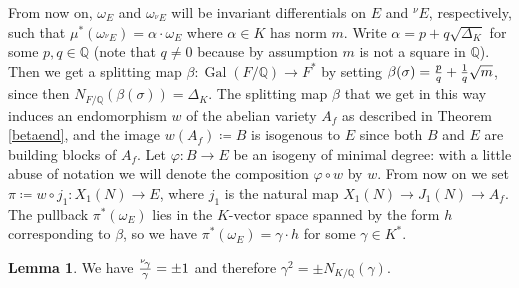 \documentclass[11pt]{amsart}
\theoremstyle{definition}
\newtheorem{lem}[definizione]{Lemma}
\begin{document}
		From now on, $\omega_E$ and $\omega_{{{}^\nu\!} E}$ will be invariant differentials on $E$ and ${{}^\nu\!} E$, respectively, such that $\mu^*(\omega_{{{}^\nu\!} E})=\alpha\cdot\omega_E$ where $\alpha\in K$ has norm $m$. Write $\alpha=p+q\sqrt{\Delta_K}$ for some $p,q\in {\mathbb{Q}}$ (note that $q\neq 0$ because by assumption $m$ is not a square in ${\mathbb{Q}}$). Then we get a splitting map $\beta\colon \operatorname{Gal}(F/{\mathbb{Q}})\to F^*$ by setting ${\displaystyle} \beta(\sigma)=\frac{p}{q}+\frac{1}{q}\sqrt{m}$, since then $N_{F/{\mathbb{Q}}}(\beta(\sigma))=\Delta_K$. The splitting map $\beta$ that we get in this way induces an endomorphism $w$ of the abelian variety $A_f$ as described in Theorem \ref{betaend}, and the image $w(A_f)\coloneqq B$ is isogenous to $E$ since both $B$ and $E$ are building blocks of $A_f$. Let $\varphi\colon B\to E$ be an isogeny of minimal degree: with a little abuse of notation we will denote the composition $\varphi\circ w$ by $w$. From now on we set $\pi\coloneqq w\circ j_1 \colon X_1(N)\to E$, where $j_1$ is the natural map $X_1(N)\to J_1(N)\to A_f$. The pullback $\pi^*(\omega_E)$ lies in the $K$-vector space spanned by the form $h$ corresponding to $\beta$, so we have $\pi^*(\omega_E)=\gamma\cdot h$ for some $\gamma\in K^*$.
			\begin{lem}\label{gammarational}
				We have ${\displaystyle} \frac{{{}^\nu\!}\gamma}{\gamma}=\pm 1$ and therefore $\gamma^2=\pm N_{K/{\mathbb{Q}}}(\gamma)$.
		\end{lem}
\end{document}
